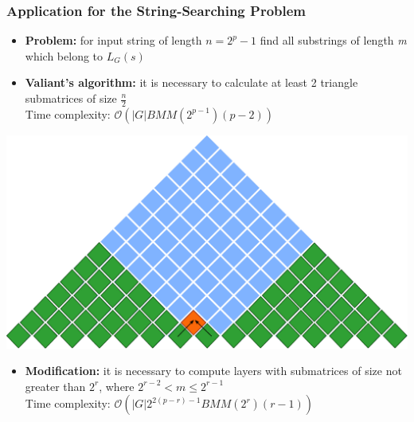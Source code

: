 \documentclass[xcolor=table]{beamer}
\begin{document}
\begin{frame}[fragile] \frametitle{Application for the String-Searching Problem}

    \begin{itemize}
      \item \textbf{Problem:} for input string of length $n = 2^p - 1$ find all substrings of length \textit{m} which belong to $L_G(s)$
      \item \textbf{Valiant's algorithm:} it is necessary to calculate at least 2 triangle submatrices of size $\frac{n}{2}$ \\ 
      Time complexity: $\mathcal{O}(|G|BMM(2^{p - 1})(p - 2))$
    \end{itemize}

    \centering\includegraphics[width = 0.5\linewidth]{pic/valsubstring3.pdf}


    \pause
    \begin{itemize}
      \item  \textbf{Modification:} it is necessary to compute layers with submatrices of size not greater than $2^r$, where $2^{r-2} < m \le 2^{r - 1}$ \\
      Time complexity: $\mathcal{O}(|G|2^{2(p - r) - 1}BMM(2^{r})(r - 1))$
  \end{itemize}

\end{frame}
\end{document}
